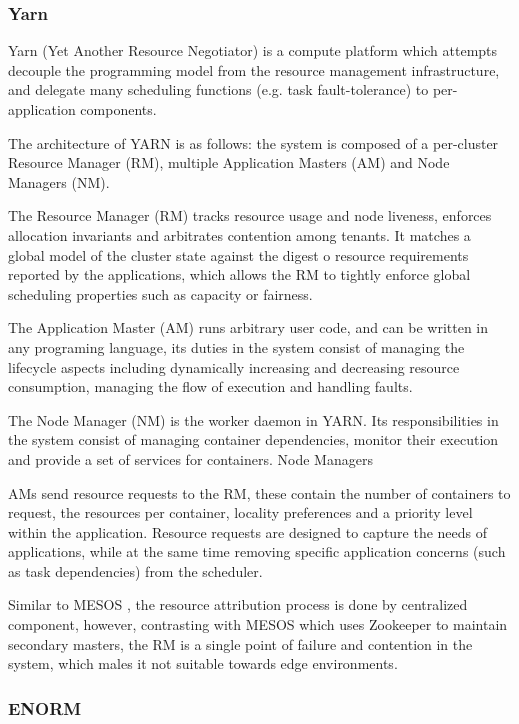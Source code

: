 \subsubsection{Yarn}

Yarn (Yet Another Resource Negotiator) \cite{Vavilapalli2013ApacheHY} is a compute platform which attempts decouple the programming model from the resource management infrastructure, and delegate many scheduling functions (e.g. task fault-tolerance) to per-application components. 

The architecture of YARN is as follows: the system is composed of a per-cluster Resource Manager (RM), multiple Application Masters (AM) and Node Managers (NM). 

The Resource Manager (RM) tracks resource usage and node liveness, enforces allocation invariants and arbitrates contention among tenants. It matches a global model of the cluster state against the digest o resource requirements reported by the applications, which allows the RM to tightly enforce global scheduling properties such as capacity or fairness.

The Application Master (AM) runs arbitrary user code, and can be written in any programing language, its duties in the system consist of managing the lifecycle aspects including dynamically increasing and decreasing resource consumption, managing the flow of execution and handling faults. 

The Node Manager (NM) is the worker daemon in YARN. Its responsibilities in the system consist of managing container dependencies, monitor their execution and provide a set of services for containers. Node Managers 

AMs send resource requests to the RM, these contain the number of containers to request, the resources per container, locality preferences and a priority level within the application. Resource requests are designed to capture the needs of applications, while at the same time removing specific application concerns (such as task dependencies) from the scheduler.

Similar to  MESOS \cite{hindman2011mesos}, the resource attribution process is done by centralized component, however, contrasting with MESOS which uses Zookeeper to maintain secondary masters, the RM is a single point of failure and contention in the system, which males it not suitable towards edge environments.

\subsubsection{ENORM}

